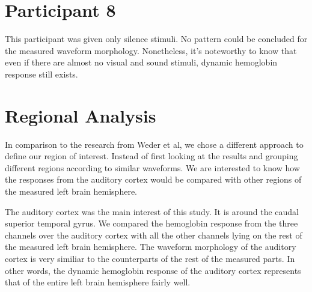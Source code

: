 \section {Participant 8}
This participant was given only silence stimuli. No pattern could be concluded for the measured waveform morphology. Nonetheless, it's noteworthy to know that even if there are almost no visual and sound stimuli, dynamic hemoglobin response still exists.

\section {Regional Analysis}
In comparison to the research from Weder et al, we chose a different approach to define our region of interest. Instead of first looking at the results and grouping different regions according to similar waveforms. We are interested to know how the responses from the auditory cortex would be compared with other regions of the measured left brain hemisphere.

The auditory cortex was the main interest of this study. It is around the caudal superior temporal gyrus. We compared the hemoglobin response from the three channels over the auditory cortex with all the other channels lying on the rest of the measured left brain hemisphere. The waveform morphology of the auditory cortex is very similiar to the counterparts of the rest of the measured parts. In other words, the dynamic hemoglobin response of the auditory cortex represents that of the entire left brain hemisphere fairly well.